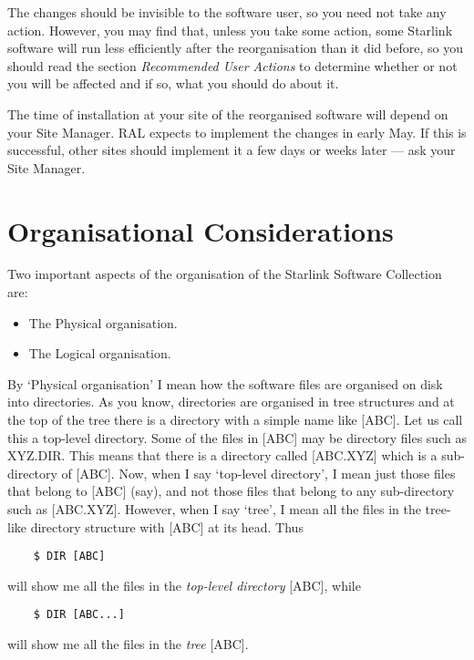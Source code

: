 The changes should be invisible to the software user, so you need not take any
action.
However, you may find that, unless you take some action, some Starlink software
will run less efficiently after the reorganisation than it did before, so you
should read the section {\em Recommended User Actions} to determine whether or
not you will be affected and if so, what you should do about it.

The time of installation at your site of the reorganised software will depend
on your Site Manager.
RAL expects to implement the changes in early May.
If this is successful, other sites should implement it a few days or weeks
later --- ask your Site Manager.

\section{Organisational Considerations}

Two important aspects of the organisation of the Starlink Software Collection
are:
\begin{itemize}
\item The Physical organisation.
\item The Logical organisation.
\end{itemize}
By `Physical organisation' I mean how the software files are organised on disk
into directories.
As you know, directories are organised in tree structures and at the top of
the tree there is a directory with a simple name like [ABC].
Let us call this a top-level directory.
Some of the files in [ABC] may be directory files such as XYZ.DIR.
This means that there is a directory called [ABC.XYZ] which is a sub-directory
of [ABC].
Now, when I say `top-level directory', I mean just those files that belong to
[ABC] (say), and not those files that belong to any sub-directory such as
[ABC.XYZ].
However, when I say `tree', I mean all the files in the tree-like directory
structure with [ABC] at its head.
Thus
\begin{verbatim}
    $ DIR [ABC]
\end{verbatim}
will show me all the files in the {\em top-level directory} [ABC], while
\begin{verbatim}
    $ DIR [ABC...]
\end{verbatim}
will show me all the files in the {\em tree} [ABC].

